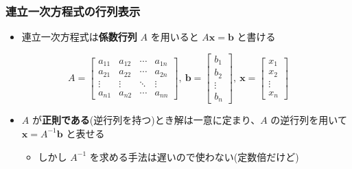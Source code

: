 \documentclass[dvipdfmx,aspectratio=169,20pt]{beamer}
\newcommand{\myfontsetting}[3]{{\fontsize{#1}{#2}\selectfont #3}}
\begin{document}
\begin{frame}
\frametitle{{\large 連立一次方程式の行列表示}}

\begin{itemize}
    \setlength{\itemsep}{0.5cm}
    \item \myfontsetting{16pt}{16pt}{連立一次方程式は{\bf 係数行列} $A$ を用いると $A\bm{x} = \bm{b}$ と書ける}
\end{itemize}

\vspace{-2mm}
\myfontsetting{14pt}{14pt}{
\begin{equation*}
    A = \begin{bmatrix}
        a_{11} & a_{12} & \cdots & a_{1n}\\
        a_{21} & a_{22} & \cdots & a_{2n}\\
        \vdots & \vdots & \ddots & \vdots\\
        a_{n1} & a_{n2} & \cdots & a_{nn}
    \end{bmatrix},\ 
    \bm{b} = \begin{bmatrix}
    b_1\\ b_2\\ \vdots\\b_n
    \end{bmatrix},\ 
    \bm{x} = \begin{bmatrix}
    x_1\\ x_2\\ \vdots\\x_n
    \end{bmatrix}
\end{equation*}
}
\vspace{-2mm}

\begin{itemize}
    \item \myfontsetting{16pt}{16pt}{$A$ が{\bf 正則である}\myfontsetting{10pt}{10pt}{(逆行列を持つ)}とき解は一意に定まり、$A$ の逆行列を用いて $\bm{x}=A^{-1}\bm{b}$ と表せる}
    \begin{itemize}
        \item \myfontsetting{14pt}{14pt}{しかし $A^{-1}$ を求める手法は遅いので使わない\myfontsetting{8pt}{8pt}{(定数倍だけど)}}
    \end{itemize}
\end{itemize}

\end{frame}
\end{document}
